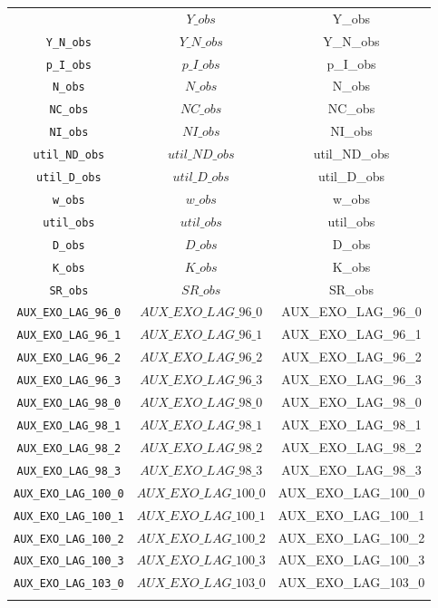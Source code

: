 \begin{center}
\begin{longtable}{ccc}
{\texttt{Y\_obs} & $Y\_obs$ & Y\_obs\\
\texttt{Y\_N\_obs} & $Y\_N\_obs$ & Y\_N\_obs\\
\texttt{p\_I\_obs} & $p\_I\_obs$ & p\_I\_obs\\
\texttt{N\_obs} & $N\_obs$ & N\_obs\\
\texttt{NC\_obs} & $NC\_obs$ & NC\_obs\\
\texttt{NI\_obs} & $NI\_obs$ & NI\_obs\\
\texttt{util\_ND\_obs} & $util\_ND\_obs$ & util\_ND\_obs\\
\texttt{util\_D\_obs} & $util\_D\_obs$ & util\_D\_obs\\
\texttt{w\_obs} & $w\_obs$ & w\_obs\\
\texttt{util\_obs} & $util\_obs$ & util\_obs\\
\texttt{D\_obs} & $D\_obs$ & D\_obs\\
\texttt{K\_obs} & $K\_obs$ & K\_obs\\
\texttt{SR\_obs} & $SR\_obs$ & SR\_obs\\
\texttt{AUX\_EXO\_LAG\_96\_0} & $AUX\_EXO\_LAG\_96\_0$ & AUX\_EXO\_LAG\_96\_0\\
\texttt{AUX\_EXO\_LAG\_96\_1} & $AUX\_EXO\_LAG\_96\_1$ & AUX\_EXO\_LAG\_96\_1\\
\texttt{AUX\_EXO\_LAG\_96\_2} & $AUX\_EXO\_LAG\_96\_2$ & AUX\_EXO\_LAG\_96\_2\\
\texttt{AUX\_EXO\_LAG\_96\_3} & $AUX\_EXO\_LAG\_96\_3$ & AUX\_EXO\_LAG\_96\_3\\
\texttt{AUX\_EXO\_LAG\_98\_0} & $AUX\_EXO\_LAG\_98\_0$ & AUX\_EXO\_LAG\_98\_0\\
\texttt{AUX\_EXO\_LAG\_98\_1} & $AUX\_EXO\_LAG\_98\_1$ & AUX\_EXO\_LAG\_98\_1\\
\texttt{AUX\_EXO\_LAG\_98\_2} & $AUX\_EXO\_LAG\_98\_2$ & AUX\_EXO\_LAG\_98\_2\\
\texttt{AUX\_EXO\_LAG\_98\_3} & $AUX\_EXO\_LAG\_98\_3$ & AUX\_EXO\_LAG\_98\_3\\
\texttt{AUX\_EXO\_LAG\_100\_0} & $AUX\_EXO\_LAG\_100\_0$ & AUX\_EXO\_LAG\_100\_0\\
\texttt{AUX\_EXO\_LAG\_100\_1} & $AUX\_EXO\_LAG\_100\_1$ & AUX\_EXO\_LAG\_100\_1\\
\texttt{AUX\_EXO\_LAG\_100\_2} & $AUX\_EXO\_LAG\_100\_2$ & AUX\_EXO\_LAG\_100\_2\\
\texttt{AUX\_EXO\_LAG\_100\_3} & $AUX\_EXO\_LAG\_100\_3$ & AUX\_EXO\_LAG\_100\_3\\
\texttt{AUX\_EXO\_LAG\_103\_0} & $AUX\_EXO\_LAG\_103\_0$ & AUX\_EXO\_LAG\_103\_0\\
}
\end{longtable}
\end{center}
